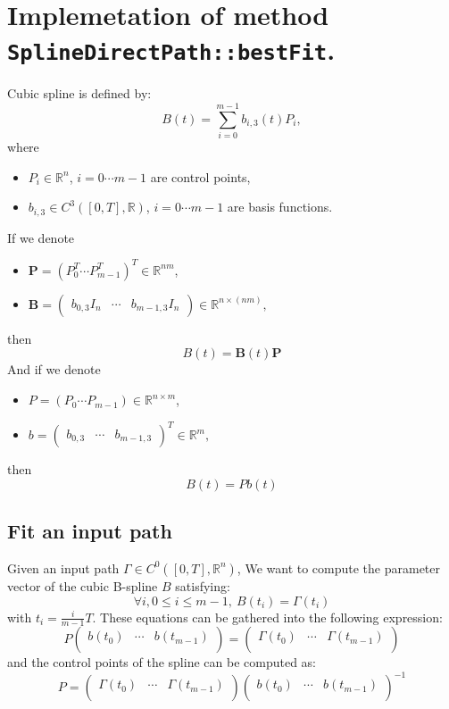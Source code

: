 \documentclass {article}
\newcommand\real{\mathbb{R}}
\newcommand\PP{\textbf{P}}
\newcommand\B{\textbf{B}}
\begin{document}
\section* {Implemetation of method \texttt{SplineDirectPath::bestFit}.}
Cubic spline is defined by:
$$
B(t) = \sum_{i=0}^{m-1} b_{i,3} (t) P_i,
$$
where
\begin{itemize}
\item $P_i\in\real^n$, $i=0\cdots m-1$ are control points,
\item $b_{i,3}\in C^3 ([0,T],\real)$, $i=0\cdots m-1$ are basis functions.
\end{itemize}
If we denote
\begin{itemize}
\item $\PP = (P_0^T \cdots P_{m-1}^T)^T\in \real^{nm}$,
\item $\B = \left(\begin{array}{ccc}
b_{0,3} I_n & \cdots & b_{m-1,3}I_n
\end{array}\right)\in\real^{n\times (nm)},$
\end{itemize}
then
$$
B(t) = \B(t) \PP
$$
And if we denote
\begin{itemize}
\item $P = (P_0 \cdots P_{m-1})\in\real^{n\times m}$,
\item $b = \left(\begin{array}{ccc}
b_{0,3}  & \cdots & b_{m-1,3}
\end{array}\right)^T\in\real^{m},$
\end{itemize}
then
$$
B(t) = P b(t)
$$
\subsection* {Fit an input path}

Given an input path $\Gamma\in C^0([0,T], \real^n)$, We want to compute the parameter vector of the cubic B-spline $B$ satisfying:
$$
\forall i, 0\leq i\leq m-1,\ B (t_i) = \Gamma (t_i)
$$
with $t_i = \frac{i}{m-1}T$. These equations can be gathered into the following expression:
$$
P
\left(\begin{array}{ccc}
b (t_0) & \cdots & b(t_{m-1}) \\
\end{array}\right)
=
\left(\begin{array}{ccc}
\Gamma (t_0) & \cdots & \Gamma (t_{m-1}) \\
\end{array}\right)
$$
and the control points of the spline can be computed as:
$$
P
=
\left(\begin{array}{ccc}
\Gamma (t_0) & \cdots & \Gamma (t_{m-1}) \\
\end{array}\right)
\left(\begin{array}{ccc}
b (t_0) & \cdots & b(t_{m-1}) \\
\end{array}\right)^{-1}
$$
\end{document}
